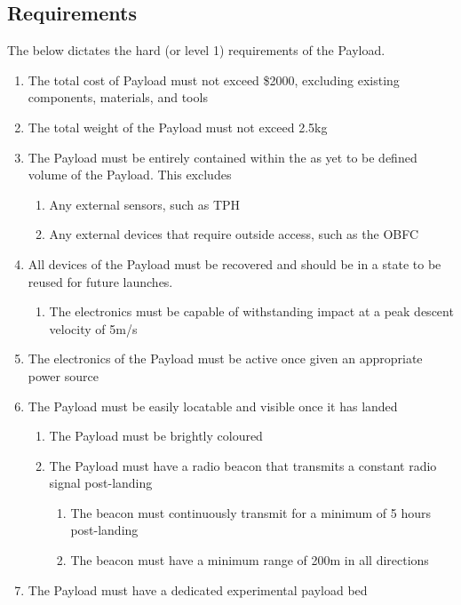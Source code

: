 \documentclass{article}
\begin{document}
\subsection{Requirements}
The below dictates the hard (or level 1) requirements of the Payload.
\begin{enumerate}
    \item The total cost of Payload must not exceed \$2000, excluding existing components, materials, and tools
    \item The total weight of the Payload must not exceed 2.5kg
    \item The Payload must be entirely contained within the as yet to be defined volume of the Payload. This excludes
        \begin{enumerate}
            \item Any external sensors, such as TPH
            \item Any external devices that require outside access, such as the OBFC
        \end{enumerate}
    \item All devices of the Payload must be recovered and should be in a state to be reused for future launches.
        \begin{enumerate}
            \item The electronics must be capable of withstanding impact at a peak descent velocity of 5m/s
        \end{enumerate}
    \item The electronics of the Payload must be active once given an appropriate power source
    \item The Payload must be easily locatable and visible once it has landed
        \begin{enumerate}
            \item The Payload must be brightly coloured
            \item The Payload must have a radio beacon that transmits a constant radio signal post-landing
                \begin{enumerate}
                    \item The beacon must continuously transmit for a minimum of 5 hours post-landing
                    \item The beacon must have a minimum range of 200m in all directions
                \end{enumerate}
        \end{enumerate}
    \item The Payload must have a dedicated experimental payload bed

\end{enumerate}
\end{document}
